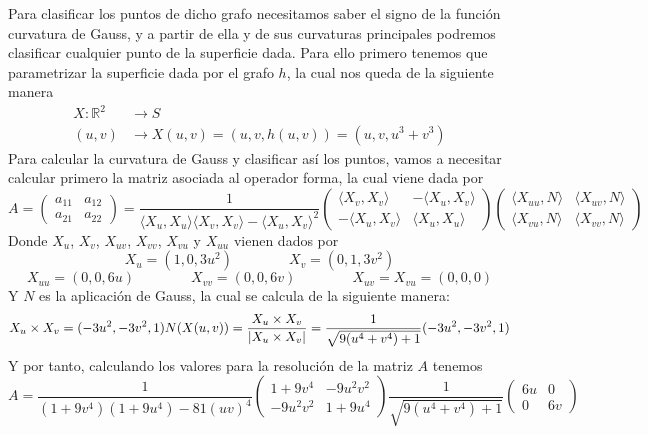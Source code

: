 \documentclass[fleqn]{article}
\def\R{\mathds{R}}
\begin{document}
    Para clasificar los puntos de dicho grafo necesitamos saber el signo de la función curvatura de Gauss, y a partir de ella y de sus curvaturas principales podremos clasificar cualquier punto
    de la superficie dada. Para ello primero tenemos que parametrizar la superficie dada por el grafo $h$, la cual nos queda de la siguiente manera
    \begin{equation*}
        \begin{aligned}
            X: \R^2 &\longrightarrow S \\
            (u,v) &\longrightarrow X(u, v) = (u, v, h(u,v)) = (u, v, u^3 + v^3)
        \end{aligned}
    \end{equation*}
    Para calcular la curvatura de Gauss y clasificar así los puntos, vamos a necesitar calcular primero la matriz asociada al operador forma, la cual viene dada por 
    \begin{equation*}
        A =
        \begin{pmatrix}
            a_{11} & a_{12} \\
            a_{21} & a_{22}
        \end{pmatrix}
        = \frac{1}{\langle X_u, X_u \rangle \langle X_v, X_v \rangle - \langle X_u, X_v \rangle ^2}
        \begin{pmatrix}
            \langle X_v, X_v \rangle & - \langle X_u, X_v \rangle \\
            -\langle X_u, X_v \rangle & \langle X_u, X_u \rangle
        \end{pmatrix}
        \begin{pmatrix}
            \langle X_{uu}, N \rangle & \langle X_{uv}, N \rangle \\
            \langle X_{vu}, N \rangle & \langle X_{vv}, N \rangle
        \end{pmatrix}
    \end{equation*}
    Donde $X_u$, $X_v$, $X_{uv}$, $X_{vv}$, $X_{vu}$ y $X_{uu}$ vienen dados por
    $$
        X_u = (1, 0, 3u^2) \quad \quad \quad \quad
        X_v = (0, 1, 3v^2)
    $$
    $$
        X_{uu} = (0, 0, 6u)\quad \quad \quad \quad
        X_{vv} = (0, 0, 6v)\quad \quad \quad \quad
        X_{uv} = X_{vu} = (0, 0, 0)
    $$
    Y $N$ es la aplicación de Gauss, la cual se calcula de la siguiente manera:
    \begin{equation*}
        X_u \times X_v = (-3u^2, - 3v^2, 1) \\
        N(X(u,v)) = \frac{X_u \times X_v}{|X_u \times X_v|} = \frac{1}{\sqrt{9(u^4 + v^4) + 1}}(-3u^2, - 3v^2, 1)
    \end{equation*}
    Y por tanto, calculando los valores para la resolución de la matriz $A$ tenemos
    $$
    A = \frac{1}{(1 + 9v^4)(1 + 9u^4) - 81(uv)^4}
    \begin{pmatrix}
        1+9v^4 & -9u^2v^2 \\
        -9u^2v^2 & 1+9u^4
    \end{pmatrix}
    \frac{1}{\sqrt{9(u^4 + v^4) + 1}}
    \begin{pmatrix}
        6u & 0 \\
        0 & 6v
    \end{pmatrix}
    $$
\end{document}
